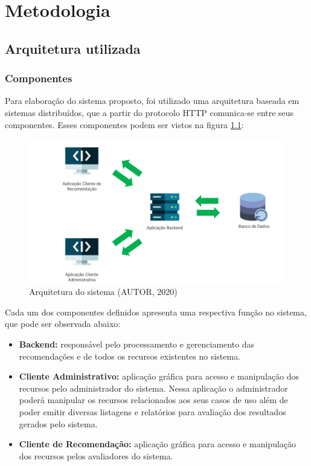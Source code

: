 

\setlength{\afterchapskip}{1.5cm minus \baselineskip}


\chapter{Metodologia}
\label{cha:metodologia}

\section{Arquitetura utilizada}

\subsection{Componentes}

Para elaboração do sistema proposto, foi utilizado uma arquitetura baseada em sistemas distribuídos, que a partir do protocolo HTTP comunica-se entre seus componentes. Esses componentes podem ser vistos na figura \ref{fig:arquitetura}:

\begin{figure}[H]
	\centering
	\includegraphics[width=0.7\linewidth]{imagens/arquitetura.png}
	\caption[Arquitetura do sistema]{Arquitetura do sistema (AUTOR, 2020)}
    \label{fig:arquitetura}
\end{figure}

Cada um dos componentes definidos apresenta uma respectiva função no sistema, que pode ser observada abaixo:

\begin{itemize}
    \item \textbf{Backend:} responsável pelo processamento e gerenciamento das recomendações e de todos os recursos existentes no sistema.
    
    \item \textbf{Cliente Administrativo:} aplicação gráfica para acesso e manipulação dos recursos pelo administrador do sistema. Nessa aplicação o administrador poderá manipular os recursos relacionados aos seus casos de uso além de poder emitir diversas listagens e relatórios para avaliação dos resultados gerados pelo sistema.
    
    \item \textbf{Cliente de Recomendação:} aplicação gráfica para acesso e manipulação dos recursos pelos avaliadores do sistema.
\end{itemize}

